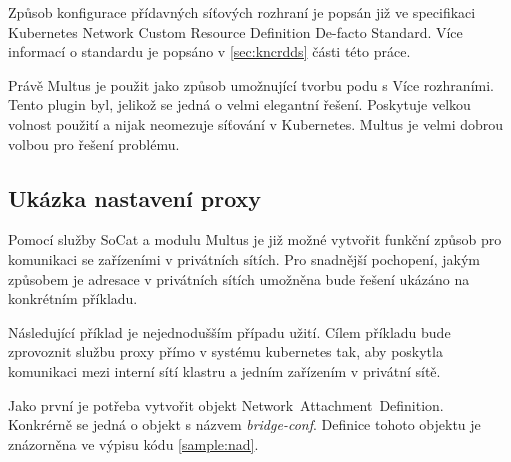 Způsob konfigurace přídavných síťových rozhraní je popsán již ve specifikaci Kubernetes Network Custom Resource Definition De-facto Standard. Více informací o standardu je popsáno v \ref{sec:kncrdds} části této práce.

Právě Multus je použit jako způsob umožnující tvorbu podu s Více rozhraními. Tento plugin byl, jelikož se jedná o velmi elegantní řešení. Poskytuje velkou volnost použití a nijak neomezuje síťování v Kubernetes. Multus je velmi dobrou volbou pro řešení problému.




\subsection{Ukázka nastavení proxy}\label{ukazkaProxy}
Pomocí služby SoCat a modulu Multus je již možné vytvořit funkční způsob pro komunikaci se zařízeními v privátních sítích. Pro snadnější pochopení, jakým způsobem je adresace v privátních sítích umožněna bude řešení ukázáno na konkrétním příkladu.

Následující příklad je nejednodušším případu užití. Cílem příkladu bude zprovoznit službu proxy přímo v systému kubernetes tak, aby poskytla komunikaci mezi interní sítí klastru a jedním zařízením v privátní sítě.

Jako první je potřeba vytvořit objekt Network~Attachment~Definition. Konkrérně se jedná o objekt s názvem \textit{bridge-conf}. Definice tohoto objektu je znázorněna ve výpisu kódu \ref{sample:nad}.

